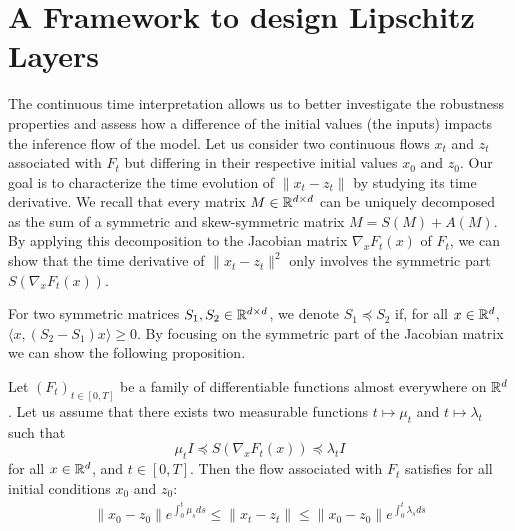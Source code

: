 \section{A Framework to design Lipschitz Layers}
\label{section:global_framework}


The continuous time interpretation allows us to better investigate the robustness properties and assess how a difference of the initial values (the inputs) impacts the inference flow of the model. Let us consider two continuous flows $x_t$ and $z_t$ associated with $F_t$ but differing in their respective initial values $x_0$ and $z_0$. Our goal is to characterize the time evolution of $\lVert x_t-z_t \rVert$ by studying its  time derivative. We recall that  every matrix $M\in\mathbb{R}^{d\times d}$ can be uniquely decomposed as the sum of a symmetric and skew-symmetric matrix $M = S(M) + A(M)$. By applying this decomposition to the Jacobian matrix $\nabla_x F_t(x)$ of $F_t$, we can show that the time derivative of $\lVert x_t-z_t \rVert^2$ only involves the symmetric part  $S(\nabla_x F_t(x))$. 

For two symmetric matrices $S_1,S_2\in\mathbb{R}^{d\times d}$,  we denote $S_1\preceq S_2$ if, for all $x\in\mathbb{R}^d$, $\langle x,(S_2-S_1)x\rangle\geq 0$. By focusing on the symmetric part of the Jacobian matrix we can show the following proposition.
\begin{prop}
\label{prop:continuous-lip}
Let $(F_{t})_{t\in[0,T]}$ be a family of differentiable  functions almost everywhere on $\mathbb{R}^d$.
Let us assume that there exists two measurable functions $t\mapsto \mu_t$ and  $t\mapsto \lambda_t$ such that
$$\mu_t I\preceq S(\nabla_xF_{t}(x))\preceq \lambda_tI$$
for all $x\in\mathbb{R}^d$, and $t\in [ 0,T]$. Then the flow associated with $F_t$ satisfies for all initial conditions $x_0$ and $z_0$:
\begin{align*}
  \lVert x_0-z_0 \rVert e^{\int_0^t\mu_s ds}\leq \lVert x_t-z_t \rVert\leq \lVert x_0-z_0 \rVert e^{\int_0^t\lambda_s ds}
\end{align*}
\end{prop}


